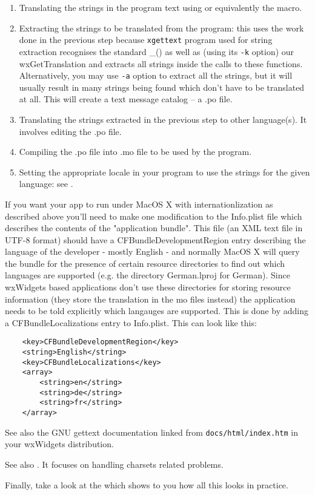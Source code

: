 \begin{enumerate}\itemsep=0pt
\item Translating the strings in the program text using 
 or equivalently the 
 macro.
\item Extracting the strings to be translated from the program: this uses the
work done in the previous step because {\tt xgettext} program used for string
extraction recognises the standard \_() as well as (using its {\tt -k} option)
our wxGetTranslation and extracts all strings inside the calls to these
functions. Alternatively, you may use {\tt -a} option to extract all the
strings, but it will usually result in many strings being found which don't
have to be translated at all. This will create a text message catalog -- a .po
file.
\item Translating the strings extracted in the previous step to other
language(s). It involves editing the .po file.
\item Compiling the .po file into .mo file to be used by the program.
\item Setting the appropriate locale in your program to use the strings for the
given language: see .
\end{enumerate}

If you want your app to run under MacOS X with internationlization as
described above you'll need to make one modification to the Info.plist
file which describes the contents of the "application bundle". This
file (an XML text file in UTF-8 format) should have a
CFBundleDevelopmentRegion entry describing the language of the developer
- mostly English - and normally MacOS X will query the bundle for the
presence of certain resource directories to find out which languages
are supported (e.g. the directory German.lproj for German). 
Since wxWidgets based applications don't use these directories
for storing resource information (they store the translation in the
mo files instead) the application needs to be told explicitly which
langauges are supported. This is done by adding a CFBundleLocalizations
entry to Info.plist. This can look like this:

\begin{verbatim}
	<key>CFBundleDevelopmentRegion</key>
	<string>English</string>
	<key>CFBundleLocalizations</key>
	<array>
		<string>en</string>
		<string>de</string>
		<string>fr</string>
	</array>
\end{verbatim}

See also the GNU gettext documentation linked from {\tt docs/html/index.htm} in
your wxWidgets distribution.

See also .
It focuses on handling charsets related problems.

Finally, take a look at the  which shows
to you how all this looks in practice.

